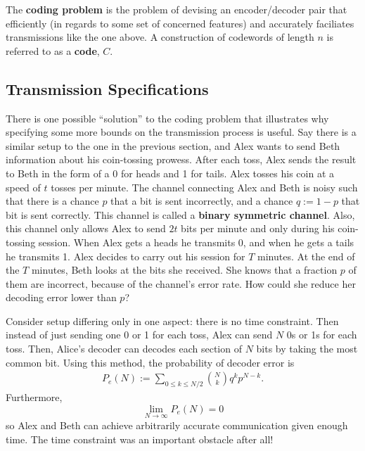\documentclass{article}
\renewcommand{\=}{\equiv}
\newcommand{\ra}{\rightarrow}
\theoremstyle{plain}
\theoremstyle{definition}
\begin{document}
The \textbf{coding problem} is the problem of devising an encoder/decoder pair that efficiently (in regards to some set of concerned features) and accurately faciliates transmissions like the one above. A construction of codewords of length $n$ is referred to as a \textbf{code}, $C$.

\subsection{Transmission Specifications}
\label{sec:trans-spec}

There is one possible ``solution'' to the coding problem that illustrates why specifying some more bounds on the transmission process is useful.
Say there is a similar setup to the one in the previous section, and Alex wants to send Beth information about his coin-tossing prowess.
After each toss, Alex sends the result to Beth in the form of a 0 for heads and 1 for tails.
Alex tosses his coin at a speed of $t$ tosses per minute.
The channel connecting Alex and Beth is noisy such that there is a chance $p$ that a bit is sent incorrectly, and a chance $q := 1-p$  that bit is sent correctly.
This channel is called a \textbf{binary symmetric channel}.
Also, this channel only allows Alex to send $2t$ bits per minute and only during his coin-tossing session.
When Alex gets a heads he transmits 0, and when he gets a tails he transmits 1.
Alex decides to carry out his session for $T$ minutes.
At the end of the $T$ minutes, Beth looks at the bits she received.
She knows that a fraction $p$ of them are incorrect, because of the channel's error rate. How could she reduce her decoding error lower than $p$?

Consider setup differing only in one aspect: there is no time constraint.
Then instead of just sending one 0 or 1 for each toss, Alex can send $N$ 0s or 1s for each toss.
Then, Alice's decoder can decodes each section of $N$ bits by taking the most common bit.
Using this method, the probability of decoder error is
\begin{align}
  P_e(N) := \sum_{0 \leq k \leq N/2} \binom{N}{k} q^k p^{N-k}.
\end{align}
Furthermore,
$$ \lim_{N \ra \infty} P_e(N) = 0 $$
so Alex and Beth can achieve arbitrarily accurate communication given enough time.
The time constraint was an important obstacle after all!

\end{document}
